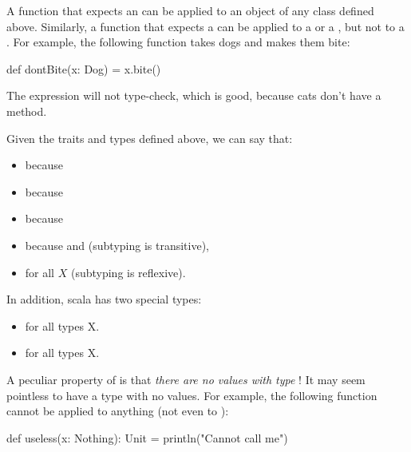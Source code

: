 \documentclass{book}
\begin{document}
A function that expects an  can be applied to an object
of any class defined above. Similarly, a function that expects a 
can be applied to a  or a , but not to a
. For example, the following function takes dogs and makes
them bite:
\begin{scalacode}
def dontBite(x: Dog) = {
  x.bite()
}
\end{scalacode}

The expression  will not type-check, which
is good, because cats don't have a  method.

Given the traits and types defined above, we can say that:
\begin{itemize}

  \item {} because 

  \item {} because 

  \item {} because 

  \item {} because  and
   (subtyping is transitive),

  \item {} for all $X$ (subtyping is reflexive).

\end{itemize}
%
In addition, scala has two special types:
%
\begin{itemize}

  \item {} for all types X.

  \item {} for all types X.

\end{itemize}

A peculiar property of  is that
\emph{there are no values with type} !
It may seem pointless to have a type with no values. For example, the following
function cannot be applied to anything (not even to ):
\begin{scalacode}
def useless(x: Nothing): Unit = {
  println("Cannot call me")
}
\end{scalacode}
\end{document}

